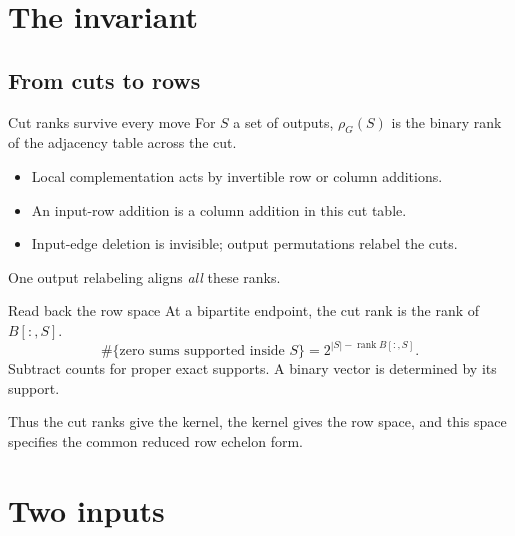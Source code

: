 \documentclass{beamer}
\begin{document}
\section{The invariant}
\subsection{From cuts to rows}
\begin{frame}{Cut ranks survive every move}
  For $S$ a set of outputs, $\rho_G(S)$ is the binary rank of the adjacency table across the cut.
  \begin{itemize}
    \item Local complementation acts by invertible row or column additions.
    \item An input-row addition is a column addition in this cut table.
    \item Input-edge deletion is invisible; output permutations relabel the cuts.
  \end{itemize}
  One output relabeling aligns \emph{all} these ranks.
\end{frame}
\begin{frame}{Read back the row space}
  At a bipartite endpoint, the cut rank is the rank of $B[:,S]$.
  \[ \#\{\text{zero sums supported inside }S\}
      =2^{|S|-\operatorname{rank} B[:,S]}. \]
  Subtract counts for proper exact supports. A binary vector is determined by its support.
  \medskip
  \par Thus the cut ranks give the kernel, the kernel gives the row space, and this space specifies the common reduced row echelon form.
\end{frame}
\section{Two inputs}
\end{document}
